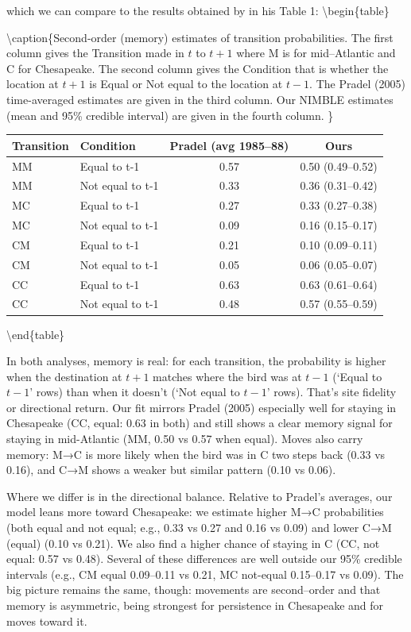 \documentclass[
  12pt,
]{krantz}
\begin{document}
which we can compare to the results obtained by \citet{pradel_multievent_2005} in his Table 1:
\textbackslash begin\{table\}

\textbackslash caption\{\label{tab:unnamed-chunk-387}Second-order (memory) estimates of transition probabilities. The first column gives the Transition made in \(t\) to \(t+1\) where M is for mid--Atlantic and C for Chesapeake. The second column gives the Condition that is whether the location at \(t+1\) is Equal or Not equal to the location at \(t-1\). The Pradel (2005) time-averaged estimates are given in the third column. Our NIMBLE estimates (mean and 95\% credible interval) are given in the fourth column. \}
\centering

\begin{tabular}[t]{l|l|c|c}
\hline
Transition & Condition & Pradel (avg 1985–88) & Ours\\
\hline
MM & Equal to t-1 & 0.57 & 0.50 (0.49–0.52)\\
\hline
MM & Not equal to t-1 & 0.33 & 0.36 (0.31–0.42)\\
\hline
MC & Equal to t-1 & 0.27 & 0.33 (0.27–0.38)\\
\hline
MC & Not equal to t-1 & 0.09 & 0.16 (0.15–0.17)\\
\hline
CM & Equal to t-1 & 0.21 & 0.10 (0.09–0.11)\\
\hline
CM & Not equal to t-1 & 0.05 & 0.06 (0.05–0.07)\\
\hline
CC & Equal to t-1 & 0.63 & 0.63 (0.61–0.64)\\
\hline
CC & Not equal to t-1 & 0.48 & 0.57 (0.55–0.59)\\
\hline
\end{tabular}

\textbackslash end\{table\}

In both analyses, memory is real: for each transition, the probability is higher when the destination at \(t+1\) matches where the bird was at \(t−1\) (`Equal to \(t-1\)' rows) than when it doesn't (`Not equal to \(t-1\)' rows). That's site fidelity or directional return. Our fit mirrors Pradel (2005) especially well for staying in Chesapeake (CC, equal: 0.63 in both) and still shows a clear memory signal for staying in mid-Atlantic (MM, 0.50 vs 0.57 when equal). Moves also carry memory: M→C is more likely when the bird was in C two steps back (0.33 vs 0.16), and C→M shows a weaker but similar pattern (0.10 vs 0.06).

Where we differ is in the directional balance. Relative to Pradel's averages, our model leans more toward Chesapeake: we estimate higher M→C probabilities (both equal and not equal; e.g., 0.33 vs 0.27 and 0.16 vs 0.09) and lower C→M (equal) (0.10 vs 0.21). We also find a higher chance of staying in C (CC, not equal: 0.57 vs 0.48). Several of these differences are well outside our 95\% credible intervals (e.g., CM equal 0.09--0.11 vs 0.21, MC not-equal 0.15--0.17 vs 0.09). The big picture remains the same, though: movements are second--order and that memory is asymmetric, being strongest for persistence in Chesapeake and for moves toward it.
\end{document}
